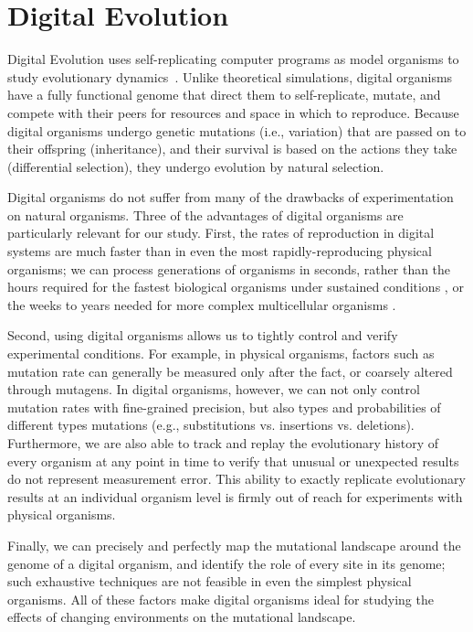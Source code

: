 \documentclass[PhD]{msu-thesis}
\begin{document}
\section{Digital Evolution}

Digital Evolution uses self-replicating computer programs as model organisms to study evolutionary dynamics~\cite{mckinley_harnessing_2008}. Unlike theoretical simulations, digital organisms have a fully functional genome that direct them to self-replicate, mutate, and compete with their peers for resources and space in which to reproduce. Because digital organisms undergo genetic mutations (i.e., variation) that are passed on to their offspring (inheritance), and their survival is based on the actions they take (differential selection), they undergo evolution by natural selection. %

Digital organisms do not suffer from many of the drawbacks of experimentation on natural organisms.  Three of the advantages of digital organisms are particularly relevant for our study.  First, the rates of reproduction in digital systems are much faster than in even the most rapidly-reproducing physical organisms; we can process generations of organisms in seconds, rather than the hours required for the fastest biological organisms under sustained conditions \cite{ryan_evolution_1953,lenski_long-term_1991}, or the weeks to years needed for more complex multicellular organisms \cite{anderson_outcrossing_2010,stearns_experimental_2000}.

Second, using digital organisms allows us to tightly control and verify experimental conditions. For example, in physical organisms, factors such as mutation rate can generally be measured only after the fact, or coarsely altered through mutagens. In digital organisms, however, we can not only control mutation rates with fine-grained precision, but also types and probabilities of different types mutations (e.g., substitutions vs. insertions vs. deletions). Furthermore, we are also able to track and replay the evolutionary history of every organism at any point in time to verify that unusual or unexpected results do not represent measurement error.  This ability to exactly replicate evolutionary results at an individual organism level is firmly out of reach for experiments with physical organisms.

Finally, we can precisely and perfectly map the mutational landscape around the genome of a digital organism, and identify the role of every site in its genome\cite{ofria_evolution_2002}; such exhaustive techniques are not feasible in even the simplest physical organisms.  All of these factors make digital organisms ideal for studying the effects of changing environments on the mutational landscape.
\end{document}
